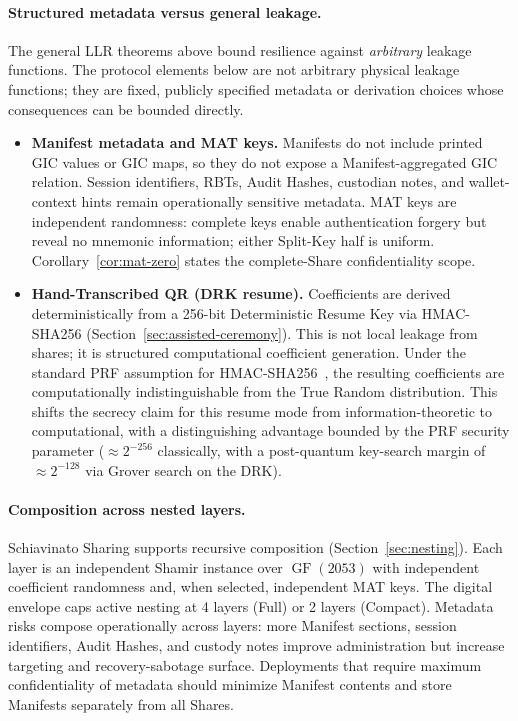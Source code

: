 \documentclass[11pt]{article}
\newcommand{\GF}{\operatorname{GF}}
\begin{document}
\paragraph{Structured metadata versus general leakage.} The general LLR theorems above bound resilience against \emph{arbitrary} leakage functions. The protocol elements below are not arbitrary physical leakage functions; they are fixed, publicly specified metadata or derivation choices whose consequences can be bounded directly.
\begin{itemize}[noitemsep]
    \item \textbf{Manifest metadata and MAT keys.} Manifests do not include printed GIC values or GIC maps, so they do not expose a Manifest-aggregated GIC relation. Session identifiers, RBTs, Audit Hashes, custodian notes, and wallet-context hints remain operationally sensitive metadata. MAT keys are independent randomness: complete keys enable authentication forgery but reveal no mnemonic information; either Split-Key half is uniform. Corollary~\ref{cor:mat-zero} states the complete-Share confidentiality scope.
    \item \textbf{Hand-Transcribed QR (DRK resume).} Coefficients are derived deterministically from a 256-bit Deterministic Resume Key via HMAC-SHA256 (Section~\ref{sec:assisted-ceremony}). This is not local leakage from shares; it is structured computational coefficient generation. Under the standard PRF assumption for HMAC-SHA256~\cite{rfc2104}, the resulting coefficients are computationally indistinguishable from the True Random distribution. This shifts the secrecy claim for this resume mode from information-theoretic to computational, with a distinguishing advantage bounded by the PRF security parameter ($\approx 2^{-256}$ classically, with a post-quantum key-search margin of $\approx 2^{-128}$ via Grover search on the DRK).
\end{itemize}

\paragraph{Composition across nested layers.} Schiavinato Sharing supports recursive composition (Section~\ref{sec:nesting}). Each layer is an independent Shamir instance over $\GF(2053)$ with independent coefficient randomness and, when selected, independent MAT keys. The digital envelope caps active nesting at 4 layers (Full) or 2 layers (Compact). Metadata risks compose operationally across layers: more Manifest sections, session identifiers, Audit Hashes, and custody notes improve administration but increase targeting and recovery-sabotage surface. Deployments that require maximum confidentiality of metadata should minimize Manifest contents and store Manifests separately from all Shares.
\end{document}
